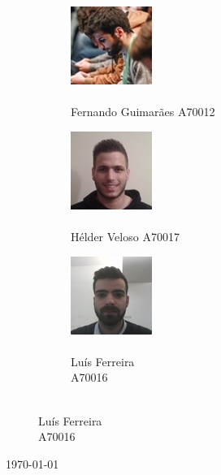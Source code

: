 \documentclass[../tp2.tex]{subfiles}
\begin{document}
\begin{titlepage}
\begin{figure}[H]
\captionsetup[subfigure]{labelformat=empty}
\begin{subfigure}{.4\textwidth}
\centering
\includegraphics[scale=1]{../imagens/nando.jpg}
\caption{\\ \centering \large Fernando Guimarães  A70012}
\end{subfigure}%
\begin{subfigure}{.3\textwidth}
\centering
\includegraphics[scale=1]{../imagens/rafael.jpg}
\caption{\\ \centering \large Hélder Veloso  A70017}
\end{subfigure}%
\begin{subfigure}{.3\textwidth}
\centering
\includegraphics[scale=1]{../imagens/luisfilipe.jpg}
\caption{\\ \centering \large Luís Ferreira \\ A70016}
\end{subfigure}%
\end{figure}%

{\large \today}\\%



\vfill %

\end{titlepage}
\end{document}
